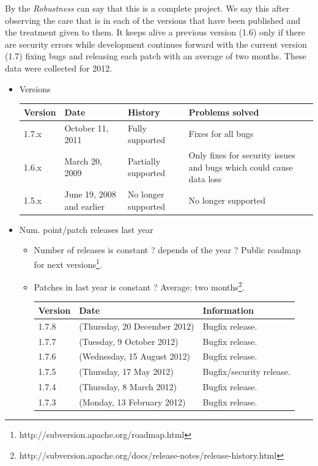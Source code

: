 \documentclass[11pt]{scrartcl}
\begin{document}
\par By the \emph{Robustness} can say that this is a complete project. We say this after observing the care that is in each of the versions that have been published and the treatment given to them. It keeps alive a previous version (1.6) only if there are security errors while development continues forward with the current version (1.7) fixing bugs and releasing each patch with an average of two months. These data were collected for 2012.

\begin{itemize}
    \item Versions

        \begin{tabular}{|l|l|l|l|}
            \hline
                {\bf Version} & {\bf Date} & {\bf History} & {\bf Problems solved}\\
            \hline
                1.7.x & October 11, 2011 & Fully supported & Fixes for all bugs\\
            \hline
                1.6.x & March 20, 2009 & Partially supported & Only fixes for security issues and bugs which could cause data loss\\
            \hline
                1.5.x & June 19, 2008 and earlier & No longer supported & No longer supported\\
            \hline
        \end{tabular}

    \item Num. point/patch releases last year
    \begin{itemize}
        \item Number of releases is constant ? depends of the year ? Public roadmap for next versions\footnote{http://subversion.apache.org/roadmap.html}.
        \item Patches in last year is constant ? Average: two months\footnote{http://subversion.apache.org/docs/release-notes/release-history.html}.

            \begin{tabular}{|l|l|l|}
                \hline Version & Date & Information\\
                \hline 1.7.8 & (Thursday, 20 December 2012) & Bugfix release.\\
                \hline 1.7.7 & (Tuesday, 9 October 2012) & Bugfix release.\\
                \hline 1.7.6 & (Wednesday, 15 August 2012) & Bugfix release.\\
                \hline 1.7.5 & (Thursday, 17 May 2012) & Bugfix/security release.\\
                \hline 1.7.4 & (Thursday, 8 March 2012) & Bugfix release.\\
                \hline 1.7.3 & (Monday, 13 February 2012) & Bugfix release.\\
                \hline
            \end{tabular}
    \end{itemize}
\end{itemize}
\end{document}
